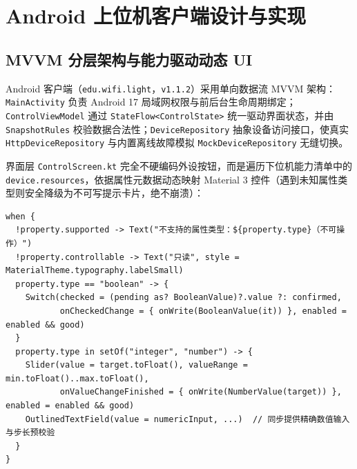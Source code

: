 \documentclass[10.5pt,a4paper]{ctexart}
\newcommand{\code}[1]{{\ttfamily\small\nolinkurl{#1}}}
\begin{document}
\section{Android 上位机客户端设计与实现}

\subsection{MVVM 分层架构与能力驱动动态 UI}
Android 客户端（\code{edu.wifi.light}，\code{v1.1.2}）采用单向数据流 MVVM 架构：\code{MainActivity} 负责 Android 17 局域网权限与前后台生命周期绑定；\code{ControlViewModel} 通过 \code{StateFlow<ControlState>} 统一驱动界面状态，并由 \code{SnapshotRules} 校验数据合法性；\code{DeviceRepository} 抽象设备访问接口，使真实 \code{HttpDeviceRepository} 与内置离线故障模拟 \code{MockDeviceRepository} 无缝切换。

界面层 \code{ControlScreen.kt} 完全不硬编码外设按钮，而是遍历下位机能力清单中的 \code{device.resources}，依据属性元数据动态映射 Material 3 控件（遇到未知属性类型则安全降级为不可写提示卡片，绝不崩溃）：

\begin{lstlisting}[language={}, caption={ControlScreen.kt 能力驱动动态控件分发核心代码}]
when {
  !property.supported -> Text("不支持的属性类型：${property.type}（不可操作）")
  !property.controllable -> Text("只读", style = MaterialTheme.typography.labelSmall)
  property.type == "boolean" -> {
    Switch(checked = (pending as? BooleanValue)?.value ?: confirmed,
           onCheckedChange = { onWrite(BooleanValue(it)) }, enabled = enabled && good)
  }
  property.type in setOf("integer", "number") -> {
    Slider(value = target.toFloat(), valueRange = min.toFloat()..max.toFloat(),
           onValueChangeFinished = { onWrite(NumberValue(target)) }, enabled = enabled && good)
    OutlinedTextField(value = numericInput, ...)  // 同步提供精确数值输入与步长预校验
  }
}
\end{lstlisting}
\end{document}
